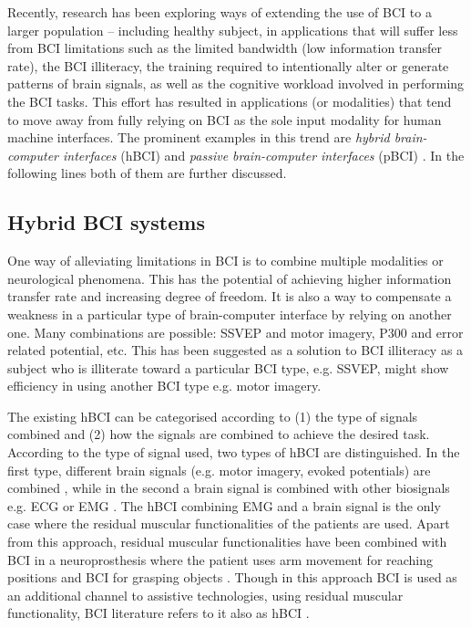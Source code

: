 Recently, research has been exploring ways of extending the use of BCI to a larger population -- including healthy subject, in applications that will suffer less from BCI limitations such as the limited bandwidth (low information transfer rate), the BCI illiteracy, the training required to intentionally alter or generate patterns of brain signals, as well as the cognitive workload involved in performing the BCI tasks. 
This effort has resulted in applications (or modalities) that tend to move away from fully relying on BCI as the sole input modality for human machine interfaces.
The prominent examples in this trend are \emph{hybrid brain-computer interfaces} (hBCI) \citep{millan_combining_2010} and \emph{passive brain-computer interfaces} (pBCI) \citep{zander_towards_2011}.
In the following lines both of them are further discussed. %

\subsection{Hybrid BCI systems}
\label{sec:hBCI-systems}

One way of alleviating limitations in BCI is to combine multiple modalities or neurological phenomena. This has the potential of achieving higher information transfer rate and increasing degree of freedom. 
It is also a way to compensate a weakness in a particular type of brain-computer interface by relying on another one.
Many combinations are possible: SSVEP and motor imagery, P300 and error related potential, etc. 
This has been suggested as a solution to BCI illiteracy as a subject who is illiterate toward a particular BCI type, e.g. SSVEP, might show efficiency in using another BCI type e.g. motor imagery.

The existing hBCI can be categorised according to (1) the type of %
signals combined and (2) how the signals %
are combined to achieve the desired task.
According to the type of %
signal used, two types of hBCI are distinguished. 
In the first type, different brain signals (e.g. motor imagery, evoked potentials) are combined \citep{ferrez_simultaneous_2008, allison_toward_2010, finke_hybrid_2011}, while in the second a brain signal is combined with other biosignals e.g. ECG \citep{scherer_self-initiation_2007} or EMG \citep{leeb_multimodal_2010}. 
The hBCI combining EMG and a brain signal is the only case where the residual muscular functionalities of the patients are used.
Apart from this approach, residual muscular functionalities have been combined with BCI in a neuroprosthesis where the patient uses arm movement for reaching positions and BCI for grasping objects \citep{millan_asynchronous_2009, millan_noninvasive_2004}. 
Though in this approach BCI is used as an additional channel to assistive technologies, using residual muscular functionality, BCI literature refers to it also as hBCI \citep{millan_combining_2010}.

